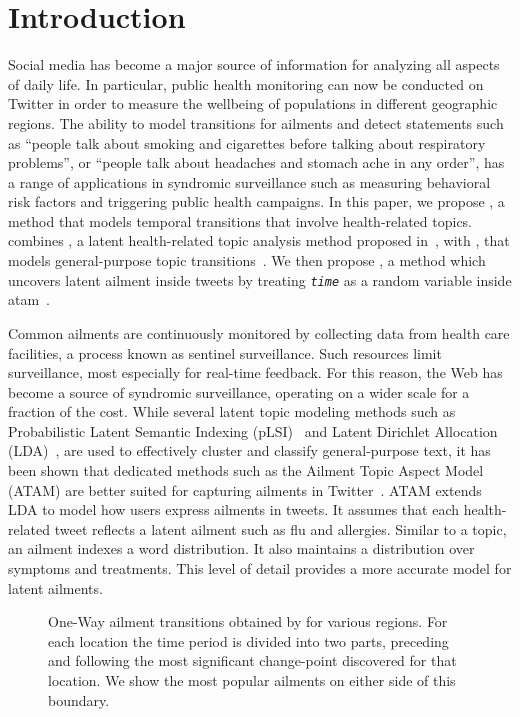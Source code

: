 \section{Introduction}
Social media has become a major source of information for analyzing
all aspects of daily life. In particular, public health monitoring can
now be conducted on Twitter in order to measure the wellbeing of
populations in different geographic regions. The ability to model
transitions for ailments and detect statements such as ``people talk
about smoking and cigarettes before talking about respiratory
problems'', or ``people talk about headaches and stomach ache in any
order'', has a range of applications in syndromic surveillance such as
measuring behavioral risk factors and triggering public health
campaigns. In this paper, we propose \tmatam, a method that models
temporal transitions that involve health-related topics. \tmatam
combines \atam, a latent health-related topic analysis method proposed
in~\cite{atam2}, with \tmlda, that models general-purpose topic
transitions~\cite{DBLP:conf/kdd/WangAB12}. We then propose \tatam,
a method which uncovers latent ailment inside tweets by treating
\texttt{\emph{time}} as a random variable inside
atam~\cite{atam2}.

Common ailments are continuously monitored by collecting data from
health care facilities, a process known as sentinel surveillance. Such
resources limit surveillance, most especially for real-time
feedback. For this reason, the Web has become a source of syndromic
surveillance, operating on a wider scale for a fraction of the
cost. While several latent topic modeling methods such as
Probabilistic Latent Semantic Indexing (pLSI)~\cite{plsi} and Latent
Dirichlet Allocation (LDA)~\cite{lda}, are used to effectively cluster
and classify general-purpose text, it has been shown that dedicated
methods such as the Ailment Topic Aspect Model (ATAM) are better
suited for capturing ailments in
Twitter~\cite{atam2}. ATAM extends LDA to model how users
express ailments in tweets. It assumes that each health-related tweet
reflects a latent ailment such as flu and allergies.  Similar to a
topic, an ailment indexes a word distribution. It also maintains a
distribution over symptoms and treatments. This level of detail
provides a more accurate model for latent ailments.

\begin{figure*}[t!]
\centering
{}
\caption{One-Way ailment transitions obtained by \tmatam for various 
regions. For each location the time period is divided into two parts, 
preceding and following the most significant change-point discovered
for that location. We show the most popular ailments on either 
side of this boundary.}
\label{fig:eyecatcher}
\end{figure*}

